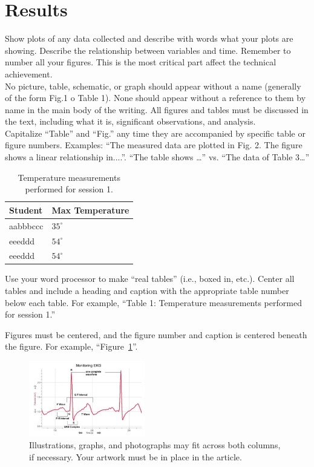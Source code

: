 \documentclass[journal]{IEEEtran}
\begin{document}
\section{Results}
Show plots of any data collected and describe with words what your plots are showing. Describe the relationship between variables and time. Remember to number all your figures.  This is the most critical part affect the technical achievement.\\
No picture, table, schematic, or graph should appear without a name (generally of the form Fig.1 o Table 1). %
None should appear without a reference to them by name in the main body of the writing.
All figures and tables must be discussed in the text, including what it is, significant observations, and analysis. \\
Capitalize “Table” and “Fig.” any time they are accompanied by specific table or figure numbers. Examples: “The measured data are plotted in Fig. 2. The figure shows a linear relationship in....”. “The table shows …” vs. “The data of Table 3…” \\

\begin{table}[!ht] %
\centering
\label{table:Exps}
\begin{tabular}{ll}
Student &  Max Temperature \\ \hline
aabbbccc &  $35^{\circ}$   \\
eeeddd &   $54^{\circ}$ \\
eeeddd &   $54^{\circ}$ \\
\end{tabular}
\caption{Temperature measurements performed for session 1.}
\end{table}


Use your word processor to make “real tables” (i.e., boxed in, etc.). Center all tables and include a heading and caption with the appropriate table number below each table. For example, “Table 1: Temperature measurements performed for session 1.” 

Figures must be centered, and the figure number and caption is centered beneath the
figure. For example, “Figure~\ref{fig:ecg}”. 

\begin{figure}[H]%
\begin {center}
\includegraphics[width=0.45\textwidth]{images/ecg.png}
\caption{Illustrations, graphs, and photographs may fit across both columns, if necessary. Your artwork must be in place in the article.}
\label{fig:ecg}
\end {center}
\end{figure}
\end{document}
